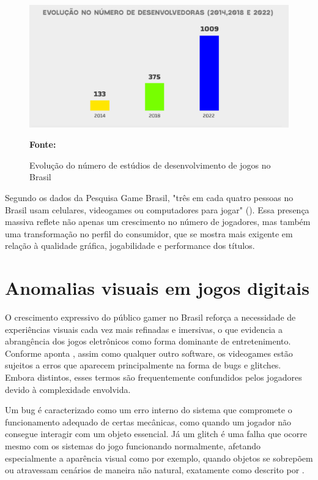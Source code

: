 \begin{figure}[H]
    \centering
    \caption{Evolução do número de estúdios de desenvolvimento de jogos no Brasil}
    \vspace{0.5cm} %
    
    \includegraphics[width=12cm]{images/abragames.png}
    
    \vspace{0.5cm} %
    
    {\small \textbf{Fonte:} }
    \label{fig:estudios}
\end{figure}

Segundo os dados da Pesquisa Game Brasil, "três em cada quatro pessoas no Brasil usam celulares, videogames ou computadores para jogar" (). Essa presença massiva reflete não apenas um crescimento no número de jogadores, mas também uma transformação no perfil do consumidor, que se mostra mais exigente em relação à qualidade gráfica, jogabilidade e performance dos títulos.

\section{Anomalias visuais em jogos digitais} %

O crescimento expressivo do público gamer no Brasil reforça a necessidade de experiências visuais cada vez mais refinadas e imersivas, o que evidencia a abrangência dos jogos eletrônicos como forma dominante de entretenimento. Conforme aponta , assim como qualquer outro software, os videogames estão sujeitos a erros que aparecem principalmente na forma de bugs e glitches. Embora distintos, esses termos são frequentemente confundidos pelos jogadores devido à complexidade envolvida.

Um bug é caracterizado como um erro interno do sistema que compromete o funcionamento adequado de certas mecânicas, como quando um jogador não consegue interagir com um objeto essencial. Já um glitch é uma falha que ocorre mesmo com os sistemas do jogo funcionando normalmente, afetando especialmente a aparência visual como por exemplo, quando objetos se sobrepõem ou atravessam cenários de maneira não natural, exatamente como descrito por .

